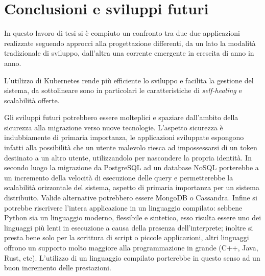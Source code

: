 \chapter{Conclusioni e sviluppi futuri}

	In questo lavoro di tesi si è compiuto un confronto tra due due applicazioni realizzate seguendo approcci alla progettazione differenti, da un lato la modalità tradizionale di sviluppo, dall'altra una corrente emergente in crescita di anno in anno.
	
	L'utilizzo di Kubernetes rende più efficiente lo sviluppo e facilita la gestione del sistema, da sottolineare sono in particolari le caratteristiche di \emph{self-healing} e scalabilità offerte.
	
	Gli sviluppi futuri potrebbero essere molteplici e spaziare dall'ambito della sicurezza alla migrazione verso nuove tecnologie.
	L'aspetto sicurezza è indubbiamente di primaria importanza, le applicazioni sviluppate espongono infatti alla possibilità che un utente malevolo riesca ad impossessarsi di un token destinato a un altro utente, utilizzandolo per nascondere la propria identità.
	In secondo luogo la migrazione da PostgreSQL ad un database NoSQL porterebbe a un incremento della velocità di esecuzione delle query e permetterebbe la scalabilità orizzontale del sistema, aspetto di primaria importanza per un sistema distribuito.
	Valide alternative potrebbero essere MongoDB o Cassandra.
	Infine si potrebbe riscrivere l'intera applicazione in un linguaggio compilato: sebbene Python sia un linguaggio moderno, flessibile e sintetico, esso risulta essere uno dei linguaggi più lenti in esecuzione a causa della presenza dell'interprete;
	inoltre si presta bene solo per la scrittura di script o piccole applicazioni, altri linguaggi offrono un supporto molto maggiore alla programmazione in grande (C++, Java, Rust, etc).
	L'utilizzo di un linguaggio compilato porterebbe in questo senso ad un buon incremento delle prestazioni.
	 